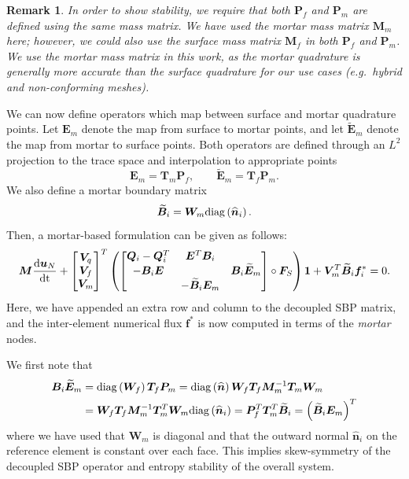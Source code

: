 \documentclass[review]{siamart0216}
\newtheorem*{remark}{Remark}
\renewcommand{\tilde}{\widetilde}
\renewcommand{\hat}{\widehat}
\newcommand{\td}[2]{\frac{{\rm d}#1}{{\rm d}{\rm #2}}}
\newcommand{\LRp}[1]{\left( #1 \right)}
\newcommand{\diag}[1]{{\rm diag}\LRp{#1}}
\begin{document}
\begin{remark}
In order to show stability, we require that both $\bm{P}_f$ and $\bm{P}_m$ are defined using the same mass matrix.  We have used the mortar mass matrix $\bm{M}_m$ here; however, we could also use the surface mass matrix $\bm{M}_f$ in both $\bm{P}_f$ and $\bm{P}_m$.  We use the mortar mass matrix in this work, as the mortar quadrature is generally more accurate than the surface quadrature for our use cases (e.g.\ hybrid and non-conforming meshes).  
\end{remark}


We can now define operators which map between surface and mortar quadrature points.  Let $\bm{E}_m$ denote the map from surface to mortar points, and let $\tilde{\bm{E}}_m $ denote the map from mortar to surface points.  Both operators are defined through an $L^2$ projection to the trace space and interpolation to appropriate points
\[
\bm{E}_m = \bm{T}_m \bm{P}_f, \qquad \tilde{\bm{E}}_m = \bm{T}_f \bm{P}_m.
\]  
We also define a mortar boundary matrix
\[
\tilde{\bm{B}}_i = \bm{W}_m\diag{\hat{\bm{n}}_i}.
\]
Then, a mortar-based formulation can be given as follows:
\begin{equation}
\bm{M}\td{\bm{u}_N}{t} + \begin{bmatrix} \bm{V}_q \\ \bm{V}_f \\ \bm{V}_m \end{bmatrix}^T
\LRp{\begin{bmatrix}
\bm{Q}_i-\bm{Q}_i^T & \bm{E}^T\bm{B}_i &\\
-\bm{B}_i\bm{E} &  & \bm{B}_i\tilde{\bm{E}}_m \\
& -\tilde{\bm{B}}_i{\bm{E}}_m & 
\end{bmatrix} \circ \bm{F}_S}\bm{1} + \bm{V}_m^T\tilde{\bm{B}}_i\bm{f}_i^* = 0.  
\label{eq:mortar}
\end{equation}
Here, we have appended an extra row and column to the decoupled SBP matrix, and the inter-element numerical flux $\bm{f}^*$ is now computed in terms of the \emph{mortar} nodes.  

We first note that
\begin{align*}
\bm{B}_i\tilde{\bm{E}}_m &= \diag{\bm{W}_f} \bm{T}_f \bm{P}_m = \diag{\hat{\bm{n}}} \bm{W}_f \bm{T}_f \bm{M}_m^{-1}\bm{T}_m\bm{W}_m\\
&=  \bm{W}_f \bm{T}_f \bm{M}_m^{-1}\bm{T}^T_m\bm{W}_m\diag{\hat{\bm{n}}_i} = \bm{P}_f^T\bm{T}^T_m \tilde{\bm{B}}_i = \LRp{\tilde{\bm{B}}_i{\bm{E}}_m}^T
\end{align*}
where we have used that $\bm{W}_m$ is diagonal and that the outward normal $\hat{\bm{n}}_i$ on the reference element is constant over each face.  This implies skew-symmetry of the decoupled SBP operator and entropy stability of the overall system.    
\end{document}
